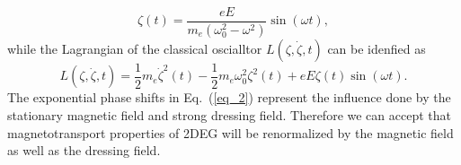 \begin{equation} \label{eq_4}
  \zeta(t) = \frac{eE}{m_e(\omega_0^2 - \omega^2)}\sin(\omega t),
\end{equation}
while the Lagrangian of the classical oscialltor $L(\zeta,\dot{\zeta},t)$ can be idenfied as
\begin{equation} \label{eq_5}
  L(\zeta,\dot{\zeta},t) = \frac{1}{2} m_e\dot{\zeta}^2(t) - \frac{1}{2}m_e\omega_0^2 \zeta^2(t) + eE\zeta(t) \sin(\omega t).
\end{equation}
The exponential phase shifts in Eq.~(\ref{eq_2}) represent the influence done by the stationary magnetic field and strong dressing field. Therefore we can accept that magnetotransport properties of 2DEG will be renormalized by the magnetic field as well as the dressing field.
